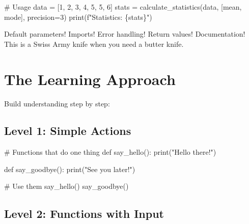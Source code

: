 \documentclass[
  letterpaper,
  DIV=11,
  numbers=noendperiod,
  oneside]{scrreprt}
\newenvironment{Shaded}{}{}
\newcommand{\BuiltInTok}[1]{\textcolor[rgb]{0.84,0.23,0.29}{#1}}
\newcommand{\CommentTok}[1]{\textcolor[rgb]{0.42,0.45,0.49}{#1}}
\newcommand{\DecValTok}[1]{\textcolor[rgb]{0.00,0.36,0.77}{#1}}
\newcommand{\KeywordTok}[1]{\textcolor[rgb]{0.84,0.23,0.29}{#1}}
\newcommand{\NormalTok}[1]{\textcolor[rgb]{0.14,0.16,0.18}{#1}}
\newcommand{\OperatorTok}[1]{\textcolor[rgb]{0.14,0.16,0.18}{#1}}
\newcommand{\SpecialCharTok}[1]{\textcolor[rgb]{0.00,0.36,0.77}{#1}}
\newcommand{\SpecialStringTok}[1]{\textcolor[rgb]{0.01,0.18,0.38}{#1}}
\newcommand{\StringTok}[1]{\textcolor[rgb]{0.01,0.18,0.38}{#1}}
\begin{document}
\begin{Shaded}
\begin{Highlighting}[]
\CommentTok{\# Usage}
\NormalTok{data }\OperatorTok{=}\NormalTok{ [}\DecValTok{1}\NormalTok{, }\DecValTok{2}\NormalTok{, }\DecValTok{3}\NormalTok{, }\DecValTok{4}\NormalTok{, }\DecValTok{5}\NormalTok{, }\DecValTok{5}\NormalTok{, }\DecValTok{6}\NormalTok{]}
\NormalTok{stats }\OperatorTok{=}\NormalTok{ calculate\_statistics(data, [}\StringTok{\textquotesingle{}mean\textquotesingle{}}\NormalTok{, }\StringTok{\textquotesingle{}mode\textquotesingle{}}\NormalTok{], precision}\OperatorTok{=}\DecValTok{3}\NormalTok{)}
\BuiltInTok{print}\NormalTok{(}\SpecialStringTok{f"Statistics: }\SpecialCharTok{\{}\NormalTok{stats}\SpecialCharTok{\}}\SpecialStringTok{"}\NormalTok{)}
\end{Highlighting}
\end{Shaded}

Default parameters! Imports! Error handling! Return values!
Documentation! This is a Swiss Army knife when you need a butter knife.

\section{The Learning Approach}\label{the-learning-approach-5}

Build understanding step by step:

\subsection{Level 1: Simple Actions}\label{level-1-simple-actions}

\begin{Shaded}
\begin{Highlighting}[]
\CommentTok{\# Functions that do one thing}
\KeywordTok{def}\NormalTok{ say\_hello():}
    \BuiltInTok{print}\NormalTok{(}\StringTok{"Hello there!"}\NormalTok{)}

\KeywordTok{def}\NormalTok{ say\_goodbye():}
    \BuiltInTok{print}\NormalTok{(}\StringTok{"See you later!"}\NormalTok{)}

\CommentTok{\# Use them}
\NormalTok{say\_hello()}
\NormalTok{say\_goodbye()}
\end{Highlighting}
\end{Shaded}

\subsection{Level 2: Functions with
Input}\label{level-2-functions-with-input}
\end{document}
